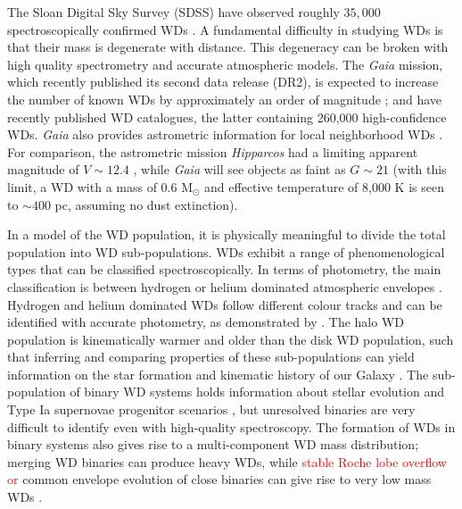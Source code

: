 \documentclass[fleqn,usenatbib]{mnras}
\newcommand{\changes}[1]{\textcolor{red}{#1}}
\begin{document}
The Sloan Digital Sky Survey (SDSS) have observed roughly $35,000$ spectroscopically confirmed WDs \citep{2013ApJS..204....5K,2015MNRAS.446.4078K,2016MNRAS.455.3413K}. A fundamental difficulty in studying WDs is that their mass is degenerate with distance. This degeneracy can be broken with high quality spectrometry and accurate atmospheric models. The \emph{Gaia} mission, which recently published its second data release (DR2), is expected to increase the number of known WDs by approximately an order of magnitude \citep{Jordan:2006jg,2014A&A...565A..11C}; \cite{2018arXiv180702559J} and \cite{2018arXiv180703315G} have recently published WD catalogues, the latter containing 260,000 high-confidence WDs. \emph{Gaia} also provides astrometric information for local neighborhood WDs \citep{2018MNRAS.479L.113K,2018MNRAS.480.3942H}. For comparison, the astrometric mission \emph{Hipparcos} had a limiting apparent magnitude of $V \sim 12.4$ \citep{1997A&A...323L..49P}, while \emph{Gaia} will see objects as faint as $G \sim 21$ (with this limit, a WD with a mass of 0.6 M$_\odot$ and effective temperature of 8,000 K is seen to ${\sim}400$ pc, assuming no dust extinction).

In a model of the WD population, it is physically meaningful to divide the total population into WD sub-populations. WDs exhibit a range of phenomenological types that can be classified spectroscopically. In terms of photometry, the main classification is between hydrogen or helium dominated atmospheric envelopes \citep{Tremblay:2007hq,2011ApJ...737...28B,2015A&A...583A..86K}. Hydrogen and helium dominated WDs follow different colour tracks and can be identified with accurate photometry, as demonstrated by \cite{Harris:2005gd,2006AJ....131..582K,Mortlock:2008gf}. The halo WD population is kinematically warmer and older than the disk WD population, such that inferring and comparing properties of these sub-populations can yield information on the star formation and kinematic history of our Galaxy \citep{1998ApJ...503..239I,2016MNRAS.463.2453D}. The sub-population of binary WD systems holds information about stellar evolution \citep{Postnov:2014tza,2017A&A...602A..16T,2018MNRAS.479L.113K} and Type Ia supernovae progenitor scenarios \citep{Livio:2018rue}, but unresolved binaries are very difficult to identify even with high-quality spectroscopy. The formation of WDs in binary systems also gives rise to a multi-component WD mass distribution; merging WD binaries can produce heavy WDs, while \changes{stable Roche lobe overflow or} common envelope evolution of close binaries can give rise to very low mass WDs \citep{2013ApJS..204....5K,2013A&A...557A..19A,2016A&A...595A..35I,2018arXiv181207226L}.
\end{document}
